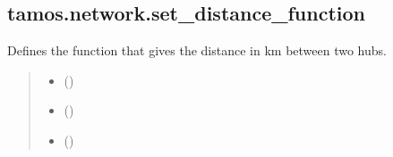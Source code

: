 \documentclass[letterpaper,10pt,english]{sphinxmanual}
\begin{document}
\sphinxstepscope


\subsection{tamos.network.set\_distance\_function}
\label{\detokenize{generated/tamos.network.set_distance_function:tamos-network-set-distance-function}}\label{\detokenize{generated/tamos.network.set_distance_function::doc}}

\begin{fulllineitems}
\label{\detokenize{generated/tamos.network.set_distance_function:tamos.network.set_distance_function}}
\pysigstartsignatures
{}
\pysigstopsignatures
\sphinxAtStartPar
Defines the function that gives the distance in km between two hubs.
\begin{quote}\begin{description}
\begin{itemize}
\item {} 
\sphinxAtStartPar
{} (\sphinxstyleliteralemphasis{\sphinxupquote{, }}\sphinxstyleliteralemphasis{\sphinxupquote{(}}\sphinxstyleliteralemphasis{\sphinxupquote{, }}\sphinxstyleliteralemphasis{\sphinxupquote{)}}\sphinxstyleliteralemphasis{\sphinxupquote{, }}) \textendash{} 

\item {} 
\sphinxAtStartPar
\sphinxstyleliteralstrong{\sphinxupquote{{[}}} () \textendash{} 

\item {} 
\sphinxAtStartPar
{}\sphinxstyleliteralstrong{\sphinxupquote{)}} (\sphinxstyleliteralemphasis{\sphinxupquote{{]} }}\sphinxstyleliteralemphasis{\sphinxupquote{ (}}) \textendash{} 


\end{itemize}
\end{description}
\end{quote}
\end{fulllineitems}
\end{document}
